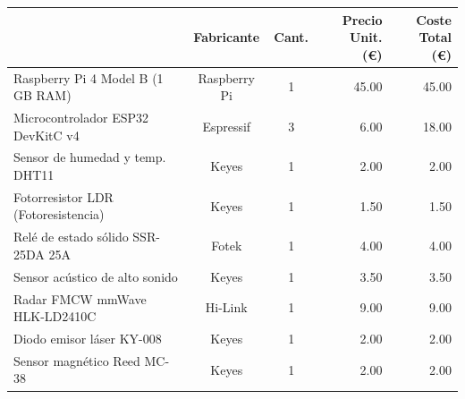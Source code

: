 \begin{table}[H]
    \centering
    \small
    \renewcommand{\arraystretch}{1.2}
    \setlength{\tabcolsep}{3pt}
    \begin{tabular}{|l|c|c|r|r|}
        \hline
        \rowcolor[gray]{0.9} 
        \multicolumn{1}{|c|}{\parbox[c]{4.2cm}{\vspace{0.15cm}\centering\textbf{Descripción del componente}\vspace{0.15cm}}} & \parbox[c]{2.0cm}{\centering\textbf{Fabricante}} & \parbox[c]{1.2cm}{\centering\textbf{Cant.}} & \parbox[c]{2.2cm}{\centering\textbf{Precio Unit.\\(\euro)}} & \parbox[c]{2.2cm}{\centering\textbf{Coste Total\\(\euro)}} \\ \hline
        \parbox[c]{4.2cm}{\vspace{0.1cm}Raspberry Pi 4 Model B (1\,GB RAM)\vspace{0.1cm}}  & Raspberry Pi  & 1 & 45.00 & 45.00 \\ \hline
        Microcontrolador ESP32 DevKitC v4   & Espressif     & 3 & 6.00  & 18.00 \\ \hline
        Sensor de humedad y temp. DHT11     & Keyes         & 1 & 2.00  & 2.00  \\ \hline
        \parbox[c]{4.2cm}{\vspace{0.1cm}Fotorresistor LDR (Fotoresistencia)\vspace{0.1cm}}  & Keyes         & 1 & 1.50  & 1.50  \\ \hline
        \parbox[c]{4.2cm}{\vspace{0.1cm}Relé de estado sólido SSR-25DA 25A\vspace{0.1cm}}  & Fotek         & 1 & 4.00  & 4.00  \\ \hline
        \parbox[c]{4.2cm}{\vspace{0.1cm}Sensor acústico de alto sonido\vspace{0.1cm}}      & Keyes         & 1 & 3.50  & 3.50  \\ \hline
        \parbox[c]{4.2cm}{\vspace{0.1cm}Radar FMCW mmWave HLK-LD2410C\vspace{0.1cm}}       & Hi-Link       & 1 & 9.00  & 9.00  \\ \hline
        Diodo emisor láser KY-008           & Keyes         & 1 & 2.00  & 2.00  \\ \hline
        Sensor magnético Reed MC-38         & Keyes         & 1 & 2.00  & 2.00  \\ \hline

\end{tabular}
\end{table}
